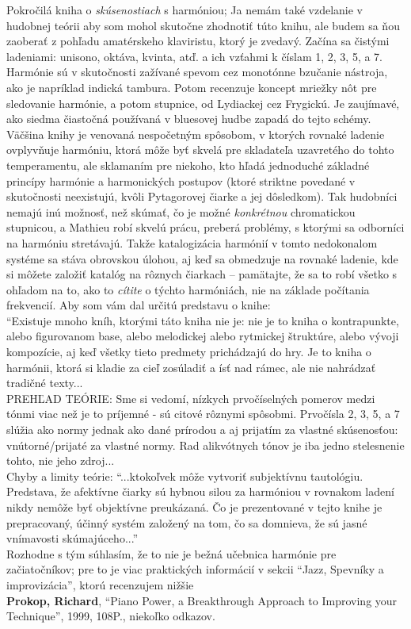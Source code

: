 Pokročilá kniha o \textit{skúsenostiach} s harmóniou; Ja nemám také vzdelanie v hudobnej teórii aby som mohol skutočne zhodnotiť túto knihu, ale budem sa ňou zaoberať z pohľadu amatérskeho klaviristu, ktorý je zvedavý. Začína sa čistými ladeniami: unisono, oktáva, kvinta, atď. a ich vzťahmi k číslam 1, 2, 3, 5, a 7. Harmónie sú v skutočnosti zažívané spevom cez monotónne bzučanie nástroja, ako je napríklad indická tambura. Potom recenzuje koncept mriežky nôt pre sledovanie harmónie, a potom stupnice, od Lydiackej cez Frygickú. Je zaujímavé, ako siedma čiastočná používaná v bluesovej hudbe zapadá do tejto schémy. Väčšina knihy je venovaná nespočetným spôsobom, v ktorých rovnaké ladenie ovplyvňuje harmóniu, ktorá môže byť skvelá pre skladateľa uzavretého do tohto temperamentu, ale sklamaním pre niekoho, kto hľadá jednoduché základné princípy harmónie a harmonických postupov (ktoré striktne povedané v skutočnosti neexistujú, kvôli Pytagorovej čiarke a jej dôsledkom). Tak hudobníci nemajú inú možnosť, než skúmať, čo je možné \textit{konkrétnou} chromatickou stupnicou, a Mathieu robí skvelú prácu, preberá problémy, s ktorými sa odborníci na harmóniu stretávajú. Takže katalogizácia harmónií v tomto nedokonalom systéme sa stáva obrovskou úlohou, aj keď sa obmedzuje na rovnaké ladenie, kde si môžete založiť katalóg na rôznych čiarkach – pamätajte, že sa to robí všetko s ohľadom na to, ako to \textit{cítite} o týchto harmóniách, nie na základe počítania frekvencií. Aby som vám dal určitú predstavu o knihe:\\
“Existuje mnoho kníh, ktorými táto kniha nie je: nie je to kniha o kontrapunkte, alebo figurovanom base, alebo melodickej alebo rytmickej štruktúre, alebo vývoji kompozície, aj keď všetky tieto predmety prichádzajú do hry. Je to kniha o harmónii, ktorá si kladie za cieľ zosúladiť a ísť nad rámec, ale nie nahrádzať tradičné texty...\\
PREHĽAD TEÓRIE: Sme si vedomí, nízkych prvočíselných pomerov medzi tónmi viac než je to príjemné - sú citové rôznymi spôsobmi. Prvočísla 2, 3, 5, a 7 slúžia ako normy jednak ako dané prírodou a aj prijatím za vlastné skúsenosťou: vnútorné/prijaté za vlastné normy. Rad alikvótnych tónov je iba jedno stelesnenie tohto, nie jeho zdroj...\\
Chyby a limity teórie: “...ktokoľvek môže vytvoriť subjektívnu tautológiu. Predstava, že afektívne čiarky sú hybnou silou za harmóniou v rovnakom ladení nikdy nemôže byť objektívne preukázaná. Čo je prezentované v tejto knihe je prepracovaný, účinný systém založený na tom, čo sa domnieva, že sú jasné vnímavosti skúmajúceho...”\\
Rozhodne s tým súhlasím, že to nie je bežná učebnica harmónie pre začiatočníkov; pre to je viac praktických informácií v sekcii “Jazz, Spevníky a improvizácia”, ktorú recenzujem nižšie 
\medskip\\
\textbf{Prokop, Richard}, “Piano Power, a Breakthrough Approach to Improving your Technique”, 1999, 108P., niekoľko odkazov. 

